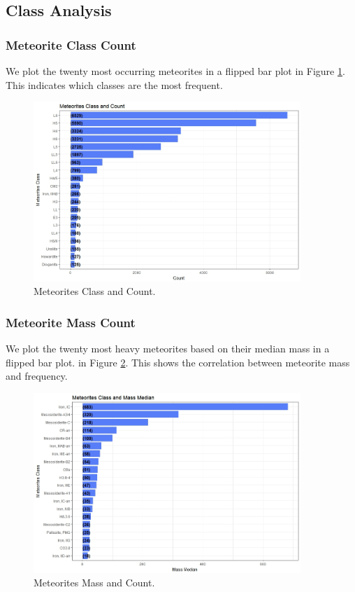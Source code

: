 \subsection{Class Analysis} 
\subsubsection{Meteorite Class Count}
We plot the twenty most occurring meteorites in a flipped bar plot in Figure \ref{fig:fig2}. This indicates which classes are the most frequent.
\begin{figure}
	\centering
	\includegraphics[width=0.9\textwidth]{Figures/02MostOccuring.jpeg}
	\caption{\label{fig:fig2} Meteorites Class and Count.}
\end{figure}

\subsubsection{Meteorite Mass Count}
We plot the twenty most heavy meteorites based on their median mass in a flipped bar plot. in Figure \ref{fig:fig4}. This shows the correlation between meteorite mass and frequency.
\begin{figure}
	\centering
	\includegraphics[width=0.9\textwidth]{Figures/04Top20Heaviest.jpeg}
	\caption{\label{fig:fig4} Meteorites Mass and Count.}
\end{figure}

